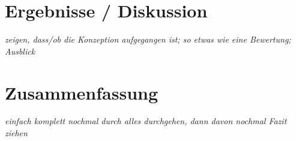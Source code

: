 \section{Ergebnisse / Diskussion}

\textit{zeigen, dass/ob die Konzeption aufgegangen ist; so etwas wie eine Bewertung; Ausblick}

\section{Zusammenfassung}

\textit{einfach komplett nochmal durch alles durchgehen, dann davon nochmal Fazit ziehen}